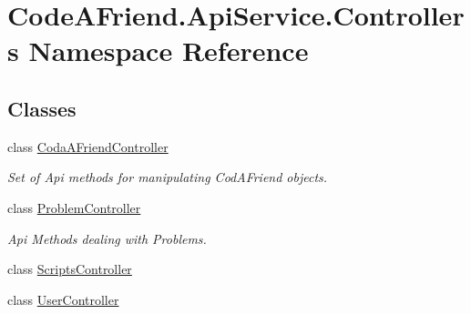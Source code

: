 \hypertarget{namespace_code_a_friend_1_1_api_service_1_1_controllers}{}\section{Code\+A\+Friend.\+Api\+Service.\+Controllers Namespace Reference}
\label{namespace_code_a_friend_1_1_api_service_1_1_controllers}
\subsection*{Classes}
\begin{DoxyCompactItemize}
\item 
class \mbox{\hyperlink{class_code_a_friend_1_1_api_service_1_1_controllers_1_1_coda_a_friend_controller}{Coda\+A\+Friend\+Controller}}
\begin{DoxyCompactList}\small\item\em Set of Api methods for manipulating Cod\+A\+Friend objects. \end{DoxyCompactList}\item 
class \mbox{\hyperlink{class_code_a_friend_1_1_api_service_1_1_controllers_1_1_problem_controller}{Problem\+Controller}}
\begin{DoxyCompactList}\small\item\em Api Methods dealing with Problems. \end{DoxyCompactList}\item 
class \mbox{\hyperlink{class_code_a_friend_1_1_api_service_1_1_controllers_1_1_scripts_controller}{Scripts\+Controller}}
\item 
class \mbox{\hyperlink{class_code_a_friend_1_1_api_service_1_1_controllers_1_1_user_controller}{User\+Controller}}
\end{DoxyCompactItemize}
